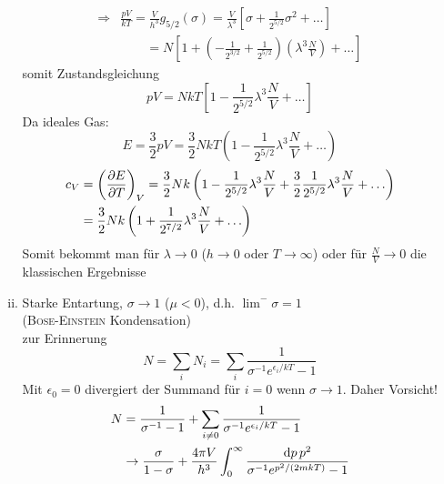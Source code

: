 \begin{enumerate}[A)]
\begin{enumerate}[i)]
\begin{equation}
\begin{split}
                \Rightarrow & \frac{ p V}{k T} = \frac{V}{h^3} g_{5/2} (\sigma) = \frac{V}{\lambda^3} \left[ \sigma + \frac{1}{2^{5/2}} \sigma^2 + \ldots \right] \\
                & \qquad = N \left[ 1 + \left( - \frac{1}{2^{3/2}} + \frac{1}{2^{5/2}} \right) \left( \lambda^3 \frac{N}{V} \right) + \ldots \right]
            \end{split}
        \end{equation}
        somit Zustandsgleichung
        \begin{equation}
            p V = N k T \left[ 1 - \frac{1}{2^{5/2}} \lambda^3 \frac{N}{V} + \ldots \right]
        \end{equation}
        Da ideales Gas:
        \begin{equation}
            E = \frac{3}{2} p V = \frac{3}{2} N k T \left( 1 - \frac{1}{2^{5/2}} \lambda^3 \frac{N}{V} + \ldots \right)
        \end{equation}
        \begin{equation}
            \begin{split}
                c_V &= \left( \frac{\partial E}{\partial T} \right)_{V} = \frac{3}{2} N k \left( 1 - \frac{1}{2^{5/2}} \lambda^3 \frac{N}{V} + \frac{3}{2} \frac{1}{2^{5/2}} \lambda^3 \frac{N}{V} + \ldots \right) \\
                &= \frac{3}{2} N k \left( 1 + \frac{1}{2^{7/2}} \lambda^3 \frac{N}{V} + \ldots \right)
            \end{split}
        \end{equation}
        Somit bekommt man für $\lambda \to 0$ ($h \to 0$ oder $T \to \infty$) oder für $\frac{N}{V} \to 0$ die klassischen Ergebnisse
        \item Starke Entartung, $\sigma \to 1$ ($\mu < 0$), d.h. $\lim^- \sigma = 1$ \\
        (\textsc{Bose-Einstein} Kondensation) \\
        zur Erinnerung
        \begin{equation}
            N = \sum_i N_i = \sum_i \frac{1}{\sigma^{-1} e^{\epsilon_i / k T}-1}
        \end{equation}
        Mit $\epsilon_0 = 0$ divergiert der Summand für $i=0$ wenn $\sigma \to 1$. Daher Vorsicht!
        \begin{equation}
            \begin{split}
                N &= \frac{1}{\sigma^{-1} - 1} + \sum_{i \neq 0} \frac{1}{\sigma^{-1} e^{\epsilon_i / k T} - 1} \\
                & \rightarrow \frac{\sigma}{1 - \sigma} + \frac{4 \pi V}{h^3} \int_0^\infty \frac{\difd p \, p^2}{\sigma^{-1} e^{p^2 / (2 m k T)} - 1} \\

\end{split}
\end{equation}
\end{enumerate}
\end{enumerate}
